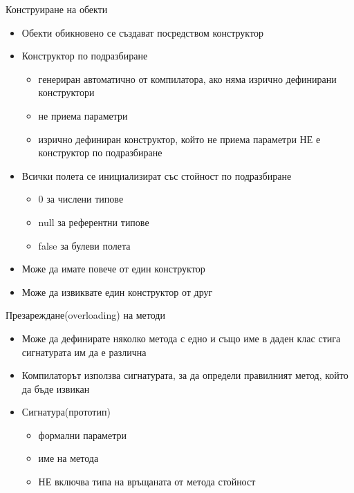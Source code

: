 \documentclass{beamer}
\begin{document}
\begin{frame}{Конструиране на обекти}
  \transdissolve
  \begin{itemize}
  \item Обекти обикновено се създават посредством конструктор \pause
  \item Конструктор по подразбиране \pause
    \begin{itemize}
      \item генериран автоматично от компилатора, ако няма изрично
        дефинирани конструктори \pause
      \item не приема параметри \pause
      \item изрично дефиниран конструктор, който не приема параметри
        \alert{НЕ} е конструктор по подразбиране \pause
    \end{itemize}
 \pause
  \item Всички полета се инициализират със стойност по подразбиране \pause
    \begin{itemize}
    \item 0 за числени типове \pause
    \item null за референтни типове \pause
    \item false за булеви полета
    \end{itemize} \pause
  \item Може да имате повече от един конструктор \pause
  \item Може да извиквате един конструктор от друг
  \end{itemize}
\end{frame}

\begin{frame}{Презареждане(overloading) на методи}
  \transdissolve
  \begin{itemize}
  \item Може да дефинирате няколко метода с едно и също име в даден
    клас стига сигнатурата им да е различна \pause
  \item Компилаторът използва сигнатурата, за да определи правилният
    метод, който да бъде извикан \pause
  \item Сигнатура(прототип)
    \begin{itemize}
    \item формални параметри \pause
    \item име на метода \pause
    \item \alert{НЕ} включва типа на връщаната от метода стойност
    \end{itemize}
  \end{itemize}
\end{frame}
\end{document}
